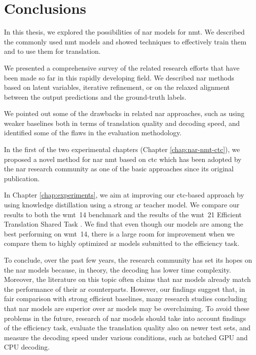 \chapter{Conclusions}
\label{chap:conclusions}

In this thesis, we explored the possibilities of \ac{nar} models for
\ac{nmt}. We described the commonly used \ac{nmt} models and showed techniques
to effectively train them and to use them for translation.

We presented a comprehensive survey of the related research efforts that have
been made so far in this rapidly developing field. We described \ac{nar}
methods based on latent variables, iterative refinement, or on the relaxed
alignment between the output predictions and the ground-truth labels.

We pointed out some of the drawbacks in related \ac{nar} approaches, such as
using weaker baselines both in terms of translation quality and decoding speed,
and identified some of the flaws in the evaluation methodology.

In the first of the two experimental chapters (Chapter \ref{chap:nar-nmt-ctc}),
we proposed a novel method for \ac{nar} \ac{nmt} based on \ac{ctc} which has
been adopted by the \ac{nar} research community as one of the basic approaches
since its original publication.

In Chapter \ref{chap:experiments}, we aim at improving our \acs{ctc}-based
approach by using knowledge distillation using a strong \ac{ar} teacher model.
We compare our results to both the \acs{wmt}~14 benchmark and the results of
the \acs{wmt}~21 Efficient Translation Shared Task
\citep{heafield-etal-2021-findings}. We find that even though our models are
among the best performing on \acs{wmt}~14, there is a large room for
improvement when we compare them to highly optimized \acl{ar} models submitted
to the efficiency task.

To conclude, over the past few years, the research community has set its hopes
on the \ac{nar} models because, in theory, the decoding has lower time
complexity. Moreover, the literature on this topic often claims that \ac{nar}
models already match the performance of their \ac{ar} counterparts. However,
our findings suggest that, in fair comparison with strong efficient baselines,
many research studies concluding that \ac{nar} models are superior over \ac{ar}
models may be overclaiming. To avoid these problems in the future, research of
\ac{nar} models should take into account findings of the efficiency task,
evaluate the translation quality also on newer test sets, and measure the
decoding speed under various conditions, such as batched GPU and CPU decoding.


